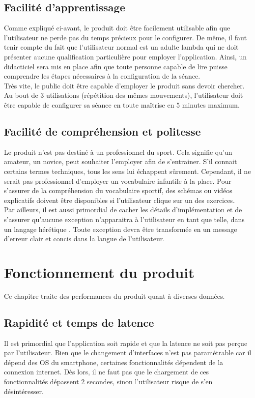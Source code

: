 \subsection*{Facilité d'apprentissage}
Comme expliqué ci-avant, le produit doit être facilement utilisable afin que l'utilisateur ne perde pas du temps précieux pour le configurer. De même, il faut tenir compte du fait que l'utilisateur normal est un adulte lambda qui ne doit présenter aucune qualification particulière pour employer l'application. Ainsi, un didacticiel sera mis en place afin que toute personne capable de lire puisse comprendre les étapes nécessaires à la configuration de la séance.\\

Très vite, le public doit être capable d'employer le produit sans devoir chercher. Au bout de 3 utilisations (répétition des mêmes mouvements), l'utilisateur doit être capable de configurer sa séance en toute maîtrise en 5 minutes maximum.

\subsection*{Facilité de compréhension et politesse}
Le produit n'est pas destiné à un professionnel du sport. Cela signifie qu'un amateur, un novice, peut souhaiter l'employer afin de s'entrainer. S'il connait certains termes techniques, tous les sens lui échappent sûrement. Cependant, il ne serait pas professionnel d'employer un vocabulaire infantile à la place. Pour s'assurer de la compréhension du vocabulaire sportif, des schémas ou vidéos explicatifs doivent être disponibles si l'utilisateur clique sur un des exercices.\\

Par ailleurs, il est aussi primordial de cacher les détails d'implémentation et de s'assurer qu'aucune exception n'apparaitra à l'utilisateur en tant que telle, dans un langage \og hérétique \fg{}. Toute exception devra être transformée en un message d'erreur clair et concis dans la langue de l'utilisateur.

\section{Fonctionnement du produit}
Ce chapitre traite des performances du produit quant à diverses données.

\subsection*{Rapidité et temps de latence}
Il est primordial que l'application soit rapide et que la latence ne soit pas perçue par l'utilisateur. Bien que le changement d'interfaces n'est pas pa\-ra\-mé\-tra\-ble car il dépend des OS du smartphone, certaines fonctionnalités dépendent de la connexion internet. Dès lors, il ne faut pas que le chargement de ces fonctionnalités dépassent 2 secondes, sinon l'utilisateur risque de s'en désintéresser.

